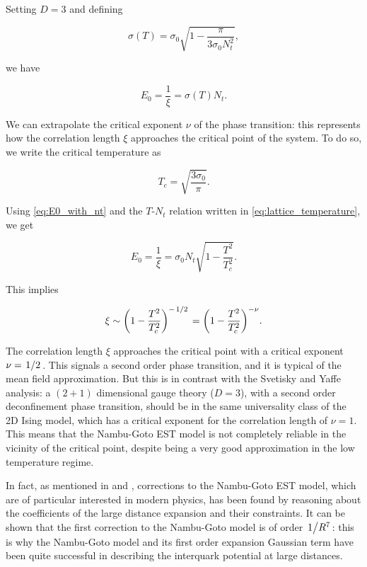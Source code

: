 \documentclass[reqno,12pt]{article}
\numberwithin{equation}{section}
\begin{document}
Setting $D = 3$ and defining 

\begin{equation}
	\sigma(T) = \sigma_0 \sqrt{1 - \frac{\pi}{3 \sigma_0 N_t^2}}, 
\end{equation}

we have

\begin{equation} \label{eq:E0_with_nt}
	E_0 = \frac{1}{\xi} = \sigma(T) N_t.
\end{equation}

We can extrapolate the critical exponent $\nu$ of the phase transition: this represents how the correlation length
$\xi$ approaches the critical point of the system. To do so, we write the critical temperature as

\begin{equation}
	T_c = \sqrt{\frac{3\sigma_0}{\pi}}.
\end{equation}

Using \eqref{eq:E0_with_nt} and the $T$-$N_t$ relation written in \eqref{eq:lattice_temperature}, we get

\begin{equation}
	E_0 = \frac{1}{\xi} = \sigma_0 N_t \sqrt{1 - \frac{T^2}{T_c^2}}.
\end{equation}

This implies

\begin{equation}
	\xi \sim \qty(1 - \frac{T^2}{T^2_c})^{-\flatfrac{1}{2}} = \qty(1 - \frac{T^2}{T^2_c})^{-\nu}.
\end{equation}

The correlation length $\xi$ approaches the critical point with a critical exponent $\nu = \flatfrac{1}{2}$. This signals
a second order phase transition, and it is typical of the mean field approximation. But this is in contrast with the
Svetisky and Yaffe analysis: a $(2+1)$ dimensional gauge theory ($D=3$), with a second order
deconfinement phase transition, should be in the same universality class of the 2D Ising model, which has a critical
exponent for the correlation length of $\nu = 1$. This means that the Nambu-Goto EST model is not completely reliable
in the vicinity of the critical point, despite being a very good approximation in the low temperature regime. 

In fact, as mentioned in \cite{caselle} and \cite{caristo}, corrections to the Nambu-Goto EST model, which are of
particular interested in modern physics, has been found by reasoning about the coefficients of the large distance expansion
and their constraints. It can be shown that the first correction to the Nambu-Goto model is of order $\flatfrac{1}{R^7}$: this
is why the Nambu-Goto model and its first order expansion Gaussian term have been quite successful in describing the
interquark potential at large distances.   
\end{document}

